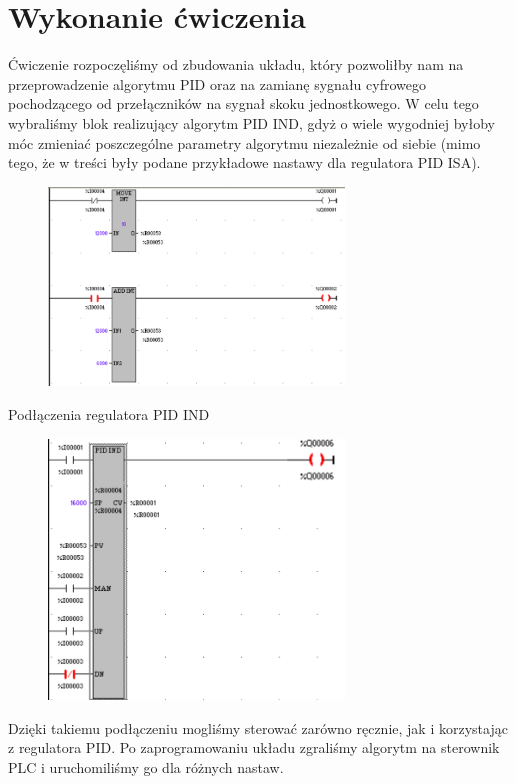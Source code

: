 \documentclass[a4paper, 12pt]{article}
\begin{document}
	\section{Wykonanie ćwiczenia}
		Ćwiczenie rozpoczęliśmy od zbudowania układu, który pozwoliłby nam na przeprowadzenie algorytmu PID oraz na zamianę sygnału cyfrowego pochodzącego od przełączników na sygnał skoku jednostkowego. W celu tego wybraliśmy blok realizujący algorytm PID IND, gdyż o wiele wygodniej byłoby móc zmieniać poszczególne parametry algorytmu niezależnie od siebie (mimo tego, że w treści były podane przykładowe nastawy dla regulatora PID ISA).
		\begin{figure}[H]
			\centering
			\includegraphics[width=0.7\textwidth]{./img/first.png}
		\end{figure}
		Podłączenia regulatora PID IND
		\begin{figure}[H]
			\centering
			\includegraphics[width=0.7\textwidth]{./img/second.png}
		\end{figure}
		Dzięki takiemu podłączeniu mogliśmy sterować zarówno ręcznie, jak i korzystając z regulatora PID. Po zaprogramowaniu układu zgraliśmy algorytm na sterownik PLC i uruchomiliśmy go dla różnych nastaw.
\end{document}
